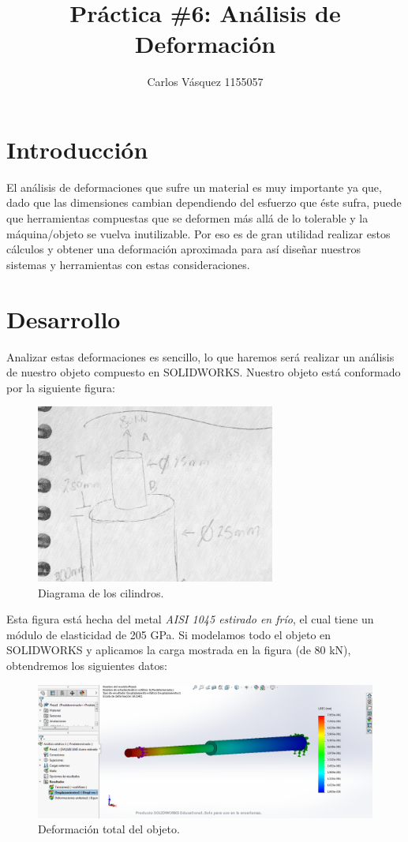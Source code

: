 \documentclass[12pt, letterpaper]{article}
\title{Práctica \#6: Análisis de Deformación}
\author{Carlos Vásquez 1155057}
\begin{document}
\maketitle
\section*{Introducción}

El análisis de deformaciones que sufre un material es muy importante ya que, dado que las dimensiones cambian dependiendo del esfuerzo que éste sufra, puede que herramientas compuestas que se deformen más allá de lo tolerable y la máquina/objeto se vuelva inutilizable. Por eso es de gran utilidad realizar estos cálculos y obtener una deformación aproximada para así diseñar nuestros sistemas y herramientas con estas consideraciones.

\section*{Desarrollo}

Analizar estas deformaciones es sencillo, lo que haremos será realizar un análisis de nuestro objeto compuesto en SOLIDWORKS. Nuestro objeto está conformado por la siguiente figura:

\begin{figure}[H]
	\centering
	\includegraphics[width=0.7\textwidth]{ph.jpg}
	\caption{Diagrama de los cilindros.}
\end{figure}

Esta figura está hecha del metal \textit{AISI 1045 estirado en frío}, el cual tiene un módulo de elasticidad de 205 GPa. Si modelamos todo el objeto en SOLIDWORKS y aplicamos la carga mostrada en la figura (de 80 kN), obtendremos los siguientes datos:

\begin{figure}[H]
	\centering
	\includegraphics[width=\textwidth]{deft.PNG}
	\caption{Deformación total del objeto.}
\end{figure}
\end{document}
